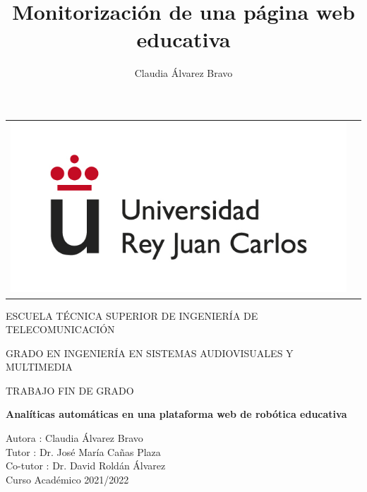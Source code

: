 \documentclass[a4paper, 12pt, oneside]{book}
\title{Monitorización de una página web educativa}
\author{Claudia Álvarez Bravo}
\begin{document}
\begin{titlepage}
\begin{center}
\begin{tabular}[c]{c c}
\includegraphics[scale=0.4]{logo-rey-juan-carlos.jpg} &
\end{tabular}


\vspace{0.5cm}

\Large
ESCUELA TÉCNICA SUPERIOR DE INGENIERÍA DE
TELECOMUNICACIÓN 
\vspace{1cm}

\Large
GRADO EN INGENIERÍA EN SISTEMAS AUDIOVISUALES Y MULTIMEDIA

\vspace{0.8cm}

TRABAJO FIN DE GRADO

\vspace{1.5cm}

\LARGE
\textbf{Analíticas automáticas en una plataforma web de robótica educativa}
\vspace{1.5cm}

\large
Autora : Claudia Álvarez Bravo \\
Tutor : Dr. José María Cañas Plaza \\
Co-tutor : Dr. David Roldán Álvarez \\

\vspace{1.5cm}
\large
Curso Académico 2021/2022
\end{center}
\end{titlepage}



\normalsize


\end{document}
